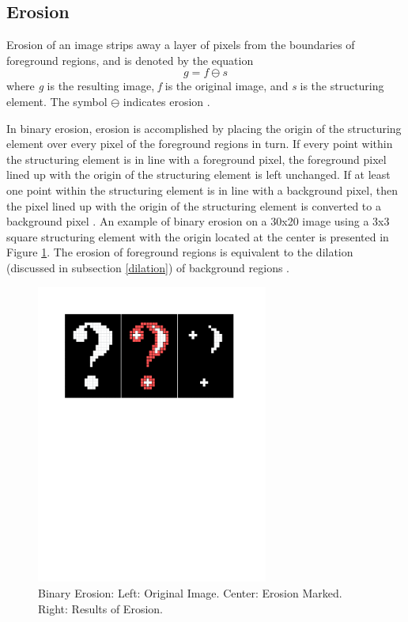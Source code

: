 \documentclass{sig-alternate}
\begin{document}
\subsection{Erosion}\label{erosion}
Erosion of an image strips away a layer of pixels from the boundaries of foreground regions, and is denoted by the equation
\begin{equation*}
g = f \ominus s
\end{equation*}
where \textit{g} is the resulting image, \textit{f} is the original image, and \textit{s} is the structuring element. The symbol $\ominus$ indicates erosion \cite{MorphologyWikiAnonymous, MorphologyBook:2000}.

In binary erosion, erosion is accomplished by placing the origin of the structuring element over every pixel of the foreground regions in turn. If every point within the structuring element is in line with a foreground pixel, the foreground pixel lined up with the origin of the structuring element is left unchanged. If at least one point within the structuring element is in line with a background pixel, then the pixel lined up with the origin of the structuring element is converted to a background pixel \cite{MorphologyWiki}. An example of binary erosion on a 30x20 image using a 3x3 square structuring element with the origin located at the center is presented in Figure \ref{binary erosion figure}. The erosion of foreground regions is equivalent to the dilation (discussed in subsection \ref{dilation}) of background regions \cite{MorphologyWiki}.
\begin{figure}
\centering
\includegraphics[width=3in,trim={0 6.75in 0 0},clip]{erosion}
\caption{Binary Erosion: Left: Original Image. Center: Erosion Marked. Right: Results of Erosion.}
\label{binary erosion figure}
\end{figure}
\end{document}
